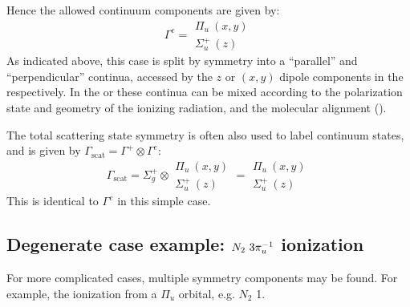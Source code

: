 \documentclass[letterpaper,table,10pt,english]{jupyterBook}
\begin{document}
\sphinxAtStartPar
Hence the allowed continuum components are given by:
\label{equation:part2/sym-fitting-intro_220423:b7e7931e-9f74-4a21-b3a2-992bbb3b4720}\begin{equation}
\Gamma^{e}=\begin{array}{c}
\Pi_{u}~(x,y)\\
\Sigma_{u}^{+}~(z)
\end{array}
\end{equation}
\sphinxAtStartPar
As indicated above, this case is split by symmetry into a “parallel” and “perpendicular” continua, accessed by the \(z\) or \((x,y)\) dipole components in the {\hyperref[\detokenize{backmatter/glossary:term-MF}]{}} respectively. In the {\hyperref[\detokenize{backmatter/glossary:term-LF}]{}} or {\hyperref[\detokenize{backmatter/glossary:term-AF}]{}} these continua can be mixed according to the polarization state and geometry of the ionizing radiation, and the molecular alignment ({\hyperref[\detokenize{backmatter/glossary:term-ADMs}]{}}).

\sphinxAtStartPar
The total scattering state symmetry is often also used to label continuum states, and is given by \(\Gamma_{\mathrm{scat}}=\Gamma^{+}\otimes\Gamma^{e}\):
\label{equation:part2/sym-fitting-intro_220423:0dc1a9c6-628d-4cbd-8d08-f3b3d2c03ef0}\begin{equation}
\Gamma_{\mathrm{scat}}=\Sigma_{g}^{+}\otimes\begin{array}{c}
\Pi_{u}~(x,y)\\
\Sigma_{u}^{+}~(z)
\end{array}=\begin{array}{c}
\Pi_{u}~(x,y)\\
\Sigma_{u}^{+}~(z)
\end{array}
\end{equation}
\sphinxAtStartPar
This is identical to \(\Gamma^{e}\) in this simple case.


\subsection{Degenerate case example: \protect\(N_2~3\pi_u^{-1}\protect\) ionization}
\label{\detokenize{part2/sym-fitting-intro_220423:degenerate-case-example-n-2-3-pi-u-1-ionization}}
\sphinxAtStartPar
For more complicated cases, multiple symmetry components may be found. For example, the ionization from a \(\Pi_u\) orbital, e.g. \(N_2\) {\hyperref[\detokenize{backmatter/glossary:term-HOMO}]{}}\sphinxhyphen{}1.
\end{document}
